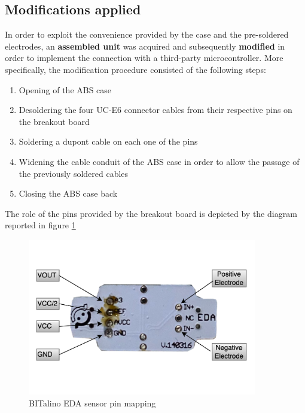 
\subsection{Modifications applied}\label{subsec:bitalno-modifications}

In order to exploit the convenience provided by the case and the pre-soldered electrodes, an \textbf{assembled unit} was acquired and subsequently \textbf{modified} in order to implement the connection with a third-party microcontroller. More specifically, the modification procedure consisted of the following steps: 

\begin{enumerate}
    \item Opening of the ABS case
    \item Desoldering the four UC-E6 connector cables from their respective pins on the breakout board
    \item Soldering a dupont cable on each one of the pins
    \item Widening the cable conduit of the ABS case in order to allow the passage of the previously soldered cables
    \item Closing the ABS case back
\end{enumerate}

The role of the pins provided by the breakout board is depicted by the diagram reported in figure \ref{fig:bitalino-pinmap}

\begin{figure}[h]
    \centering
    \includegraphics[width=10cm]{./images/bitalino.drawio.png}
    \caption{BITalino EDA sensor pin mapping}
    \label{fig:bitalino-pinmap}
\end{figure}

\vspace{1cm}

